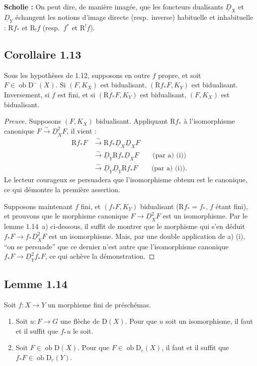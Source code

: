 \documentclass[11pt]{article}
\newcommand{\R}{\mathrm{R}}
\newcommand{\D}{\mathrm{D}}
\newcommand{\ob}{\operatorname{ob}}
\providecommand{\ob}{\operatorname{ob}}
\providecommand{\R}{\mathrm R}
\begin{document}
\textbf{Scholie :} On peut dire, de manière imagée, que les foncteurs dualisants $\underline{D}_X$ et $\underline{D}_Y$ échangent les notions d'image directe (resp.~inverse) habituelle et inhabituelle : $\R f_{*}$ et $\R_{!}f$ (resp.~$f^{*}$ et $\R^{!}f$).

\subsection*{Corollaire 1.13}
Sous les hypothèses de 1.12, supposons en outre $f$ propre, et soit $F \in \ob \D^{-}(X)$. Si $(F, K_X)$ est bidualisant, $(\R f_{*}F, K_Y)$ est bidualisant. Inversement, si $f$ est fini, et si $(\R f_{*}F, K_Y)$ est bidualisant, $(F, K_X)$ est bidualisant.

\begin{proof}[Preuve]
Supposons $(F, K_X)$ bidualisant. Appliquant $\R f_{*}$ à l'isomorphisme canonique $F \xrightarrow{\sim} \underline{D}_X^{2} F$, il vient :
\begin{align*}
\R f_{*} F &\xrightarrow{\sim} \R f_{*} \underline{D}_X \underline{D}_X F \\
&\xrightarrow{\sim} \underline{D}_Y \R f_{*} \underline{D}_X F \qquad \text{(par a) (i))} \\
&\xrightarrow{\sim} \underline{D}_Y \underline{D}_Y \R f_{*} F \qquad \text{(par a) (i)).}
\end{align*}
Le lecteur courageux se persuadera que l'isomorphisme obtenu est le canonique, ce qui démontre la première assertion.

Supposons maintenant $f$ fini, et $(f_{*}F, K_Y)$ bidualisant ($\R f_{*} = f_{*}$, $f$ étant fini), et prouvons que le morphisme canonique $F \to \underline{D}_X^{2} F$ est un isomorphisme. Par le lemme 1.14~a) ci-dessous, il suffit de montrer que le morphisme qui s'en déduit $f_{*}F \to f_{*}\underline{D}_X^{2} F$ est un isomorphisme. Mais, par une double application de a) (i), ``on se persuade'' que ce dernier n'est autre que l'isomorphisme canonique $f_{*}F \to \underline{D}_Y^{2} f_{*}F$, ce qui achève la démonstration.
\end{proof}

\subsection*{Lemme 1.14}
Soit $f : X \to Y$ un morphisme fini de préschémas.
\begin{enumerate}
\item[a)] Soit $u : F \to G$ une flèche de $\D(X)$. Pour que $u$ soit un isomorphisme, il faut et il suffit que $f_{*}u$ le soit.
\item[b)] Soit $F \in \ob \D(X)$. Pour que $F \in \ob \D_c(X)$, il faut et il suffit que $f_{*}F \in \ob \D_c(Y)$.
\end{enumerate}
\end{document}
